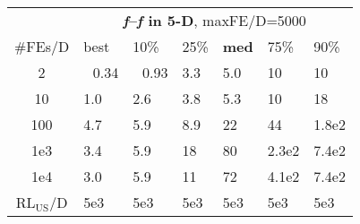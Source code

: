 \begin{tabular}{c|llllll}
 & \multicolumn{6}{|c}{\textbf{\textit{f}\raisebox{-0.35ex}{1}--\textit{f}\raisebox{-0.35ex}{24} in 5-D}, maxFE/D=5000}\\
\#FEs/D & best & 10\% & 25\% & \textbf{med} & 75\% & 90\%\\
2 & ~\,0.34 & ~\,0.93 & \hspace*{1ex}3.3 & \hspace*{1ex}5.0 & 10 & 10\\
10 & \hspace*{1ex}1.0 & \hspace*{1ex}2.6 & \hspace*{1ex}3.8 & \hspace*{1ex}5.3 & 10 & 18\\
100 & \hspace*{1ex}4.7 & \hspace*{1ex}5.9 & \hspace*{1ex}8.9 & 22 & 44 & 1.8e2\\
1e3 & \hspace*{1ex}3.4 & \hspace*{1ex}5.9 & 18 & 80 & 2.3e2 & 7.4e2\\
1e4 & \hspace*{1ex}3.0 & \hspace*{1ex}5.9 & 11 & 72 & 4.1e2 & 7.4e2\\
$\text{RL}_{\text{US}}$/D & 5e3 & 5e3 & 5e3 & 5e3 & 5e3 & 5e3
\end{tabular}
